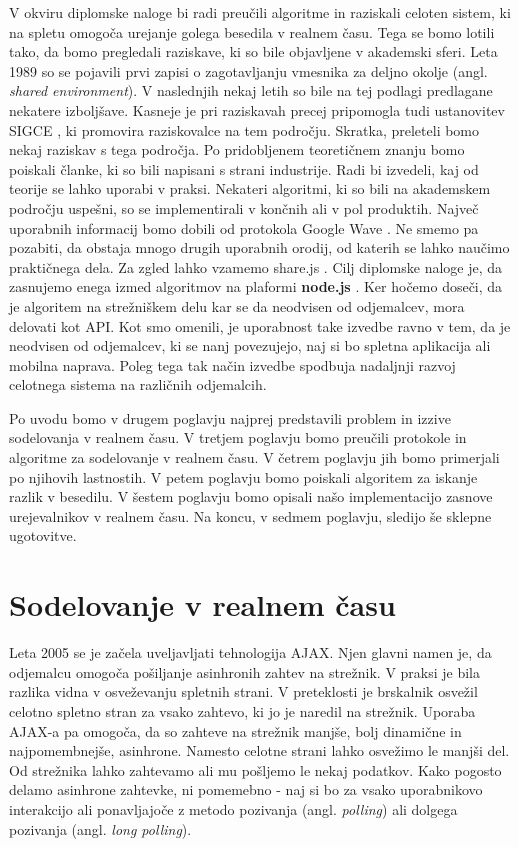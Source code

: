 \documentclass[a4paper, 12pt, twoside]{book}
\begin{document}
V okviru diplomske naloge bi radi preučili algoritme in raziskali celoten sistem, ki na spletu omogoča urejanje golega besedila v realnem času. Tega se bomo lotili tako, da bomo pregledali raziskave, ki so bile objavljene v akademski sferi. Leta 1989 so se pojavili prvi zapisi \cite{ccigs} o zagotavljanju vmesnika za deljno okolje  (angl. \textit{shared environment}). V naslednjih nekaj letih so bile na tej podlagi predlagane nekatere izboljšave. Kasneje je pri raziskavah precej pripomogla tudi ustanovitev SIGCE \cite{sigce}, ki promovira raziskovalce na tem področju. Skratka, preleteli bomo nekaj raziskav s tega področja. Po pridobljenem teoretičnem znanju bomo poiskali članke, ki so bili napisani s strani industrije. Radi bi izvedeli, kaj od teorije se lahko uporabi v praksi. Nekateri algoritmi, ki so bili na akademskem področju uspešni, so se implementirali v končnih ali v pol produktih. Največ uporabnih informacij bomo dobili od protokola Google Wave \cite{wave-ot}. Ne smemo pa pozabiti, da obstaja mnogo drugih uporabnih orodij, od katerih se lahko naučimo praktičnega dela. Za zgled lahko vzamemo share.js \cite{share}. Cilj diplomske naloge je, da zasnujemo enega izmed algoritmov na plaformi \textbf{node.js} \cite{node}.  Ker hočemo doseči, da je algoritem na strežniškem delu kar se da neodvisen od odjemalcev, mora delovati kot API. Kot smo omenili, je uporabnost take izvedbe ravno v tem, da je neodvisen od odjemalcev, ki se nanj povezujejo, naj si bo spletna aplikacija ali mobilna naprava. Poleg tega tak način izvedbe spodbuja nadaljnji razvoj celotnega sistema na različnih odjemalcih.

Po uvodu bomo v drugem poglavju najprej predstavili problem in izzive sodelovanja v realnem času. V tretjem poglavju bomo preučili protokole in algoritme za sodelovanje v realnem času. V četrem poglavju jih bomo primerjali po njihovih lastnostih. V petem poglavju bomo poiskali algoritem za iskanje razlik v besedilu. V šestem poglavju bomo opisali našo implementacijo zasnove urejevalnikov v realnem času. Na koncu, v sedmem poglavju, sledijo še sklepne ugotovitve.

\chapter{Sodelovanje v realnem času}

Leta 2005 se je začela uveljavljati tehnologija AJAX. Njen glavni namen je, da odjemalcu omogoča pošiljanje asinhronih zahtev na strežnik. V praksi je bila razlika vidna v osveževanju spletnih strani. V preteklosti je brskalnik osvežil celotno spletno stran za vsako zahtevo, ki jo je naredil na strežnik. Uporaba AJAX-a pa omogoča, da so zahteve na strežnik manjše, bolj dinamične in najpomembnejše, asinhrone. Namesto celotne strani lahko osvežimo le manjši del. Od strežnika lahko zahtevamo ali mu pošljemo le nekaj podatkov. Kako pogosto delamo asinhrone zahtevke, ni pomemebno - naj si bo za vsako uporabnikovo interakcijo ali ponavljajoče z metodo pozivanja (angl. \textit{polling}) \cite{diffsync} ali dolgega pozivanja (angl. \textit{long polling}).
\end{document}
